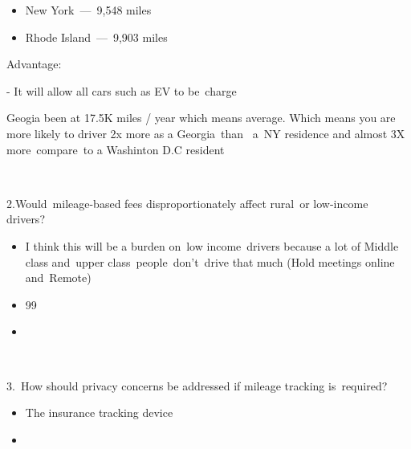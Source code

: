 \begin{itemize}
\item New York — 9,548 miles 


\end{itemize}

\begin{itemize}
\item Rhode Island — 9,903 miles 


\end{itemize}

Advantage: 


-	It will allow all cars such as EV to be charge  


Geogia been at 17.5K miles / year which means average. Which means you are more likely to driver 2x more as a Georgia than  a NY residence and almost 3X more compare to a Washinton D.C resident 


 


2.Would mileage-based fees disproportionately affect rural or low-income drivers? 


\begin{itemize}
\item I think this will be a burden on low income drivers because a lot of Middle class and upper class people don’t drive that much (Hold meetings online and Remote) 


\end{itemize}

\begin{itemize}
\item 99%


\end{itemize}

\begin{itemize}
\item  


\end{itemize}

 


3. How should privacy concerns be addressed if mileage tracking is required?  


\begin{itemize}
\item The insurance tracking device  


\end{itemize}

\begin{itemize}
\item  


\end{itemize}


